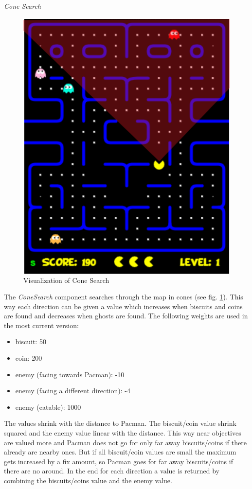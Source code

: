 \emph{Cone Search} \newline
\begin{figure}
	\caption{Visualization of Cone Search}
	\label{fig:cone}
	\centering
	\includegraphics[scale=0.65]{pictures/Pacman/Cone.png}
\end{figure}
The \textit{ConeSearch} component searches through the map in cones (see fig. \ref{fig:cone}). This way each direction can be given a value which increases when biscuits and coins are found and decreases when ghosts are found. The following weights are used in the most current version:
\begin{itemize}
	\item biscuit: 50
	\item coin: 200
	\item enemy (facing towards Pacman): -10
	\item enemy (facing a different direction): -4
	\item enemy (eatable): 1000
\end{itemize}
The values shrink with the distance to Pacman. The biscuit/coin value shrink squared and the enemy value linear with the distance. This way near objectives are valued more and Pacman does not go for only far away biscuits/coins if there already are nearby ones. But if all biscuit/coin values are small the maximum gets increased by a fix amount, so Pacman goes for far away biscuits/coins if there are no around. In the end for each direction a value is returned by combining the biscuits/coins value and the enemy value. 

